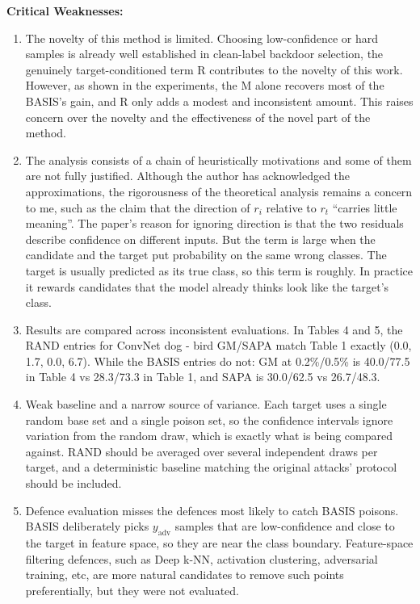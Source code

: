 \noindent\textbf{Critical Weaknesses:}

\begin{enumerate}
    \item The novelty of this method is limited. Choosing low-confidence or hard samples is already well established in clean-label backdoor selection, the genuinely target-conditioned term R contributes to the novelty of this work. However, as shown in the experiments, the M alone recovers most of the BASIS's gain, and R only adds a modest and inconsistent amount. This raises concern over the novelty and the effectiveness of the novel part of the method.

    \item The analysis consists of a chain of heuristically motivations and some of them are not fully justified. Although the author has acknowledged the approximations, the rigorousness of the theoretical analysis remains a concern to me, such as the claim that the direction of $r_i$ relative to $r_t$ ``carries little meaning''. The paper's reason for ignoring direction is that the two residuals describe confidence on different inputs. But the term is large when the candidate and the target put probability on the same wrong classes. The target is usually predicted as its true class, so this term is roughly. In practice it rewards candidates that the model already thinks look like the target's class.

    \item Results are compared across inconsistent evaluations. In Tables 4 and 5, the RAND entries for ConvNet dog - bird GM/SAPA match Table 1 exactly (0.0, 1.7, 0.0, 6.7). While the BASIS entries do not: GM at 0.2\%/0.5\% is 40.0/77.5 in Table 4 vs 28.3/73.3 in Table 1, and SAPA is 30.0/62.5 vs 26.7/48.3.

    \item Weak baseline and a narrow source of variance. Each target uses a single random base set and a single poison set, so the confidence intervals ignore variation from the random draw, which is exactly what is being compared against. RAND should be averaged over several independent draws per target, and a deterministic baseline matching the original attacks' protocol should be included.

    \item Defence evaluation misses the defences most likely to catch BASIS poisons. BASIS deliberately picks $y_{\mathrm{adv}}$ samples that are low-confidence and close to the target in feature space, so they are near the class boundary. Feature-space filtering defences, such as Deep k-NN, activation clustering, adversarial training, etc, are more natural candidates to remove such points preferentially, but they were not evaluated.
\end{enumerate}




